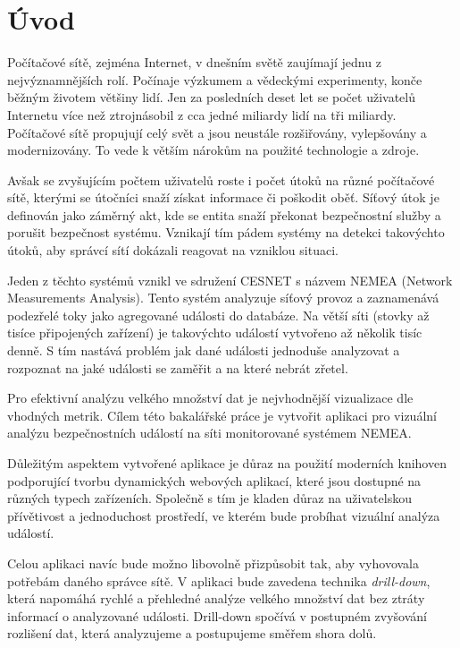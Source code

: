 
\newcommand\note[1]{{\Large \textcolor{red}{#1}}}

\chapter{Úvod}
Počítačové sítě, zejména Internet, v dnešním světě zaujímají jednu z nejvýznamnějších rolí. Počínaje výzkumem a vědeckými experimenty, konče běžným životem většiny lidí. Jen za posledních deset let se počet uživatelů Internetu více než ztrojnásobil z cca jedné miliardy lidí na tři miliardy. Počítačové sítě propujují celý svět a jsou neustále rozšiřovány, vylepšovány a modernizovány. To vede k větším nárokům na použité technologie a zdroje. 

Avšak se zvyšujícím počtem uživatelů roste i počet útoků na různé počítačové sítě, kterými se útočníci snaží získat informace či poškodit oběť. Síťový útok\cite{rfcAttack} je definován jako záměrný akt, kde se entita snaží překonat bezpečnostní služby a porušit bezpečnost systému. Vznikají tím pádem systémy na detekci takovýchto útoků, aby správcí sítí dokázali reagovat na vzniklou situaci.

Jeden z těchto systémů vznikl ve sdružení CESNET s názvem NEMEA (Network Measurements Analysis). Tento systém analyzuje síťový provoz a zaznamenává podezřelé toky jako agregované události do databáze. Na větší síti (stovky až tisíce připojených zařízení) je takovýchto událostí vytvořeno až několik tisíc denně. S tím nastává problém jak dané události jednoduše analyzovat a rozpoznat na jaké události se zaměřit a na které nebrát zřetel.

Pro efektivní analýzu velkého množství dat je nejvhodnější vizualizace dle vhodných metrik. Cílem této bakalářské práce je vytvořit aplikaci pro vizuální analýzu bezpečnostních událostí na síti monitorované systémem NEMEA. 

Důležitým aspektem vytvořené aplikace je důraz na použití moderních knihoven podporující tvorbu dynamických webových aplikací, které jsou dostupné na různých typech zařízeních. Společně s tím je kladen důraz na uživatelskou přívětivost a jednoduchost prostředí, ve kterém bude probíhat vizuální analýza událostí.

Celou aplikaci navíc bude možno libovolně přizpůsobit tak, aby vyhovovala potřebám daného správce sítě. V aplikaci bude zavedena technika {\it drill-down}, která napomáhá rychlé a přehledné analýze velkého množství dat bez ztráty informací o analyzované události. Drill-down spočívá v postupném zvyšování rozlišení dat, která analyzujeme a postupujeme směřem shora dolů.

